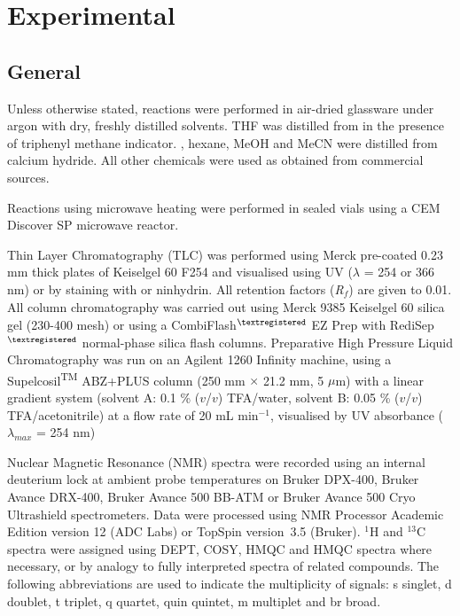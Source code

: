 \newpage

\section{Experimental}

\subsection{General}

Unless otherwise stated, reactions were performed in air-dried glassware under argon with dry, freshly distilled solvents. THF was distilled from  in the presence of triphenyl methane indicator. , hexane, MeOH and MeCN were distilled from calcium hydride. All other chemicals were used as obtained from commercial sources.

Reactions using microwave heating were performed in sealed vials using a CEM Discover SP microwave reactor. 

Thin Layer Chromatography (TLC) was performed using Merck pre-coated 0.23 mm thick plates of Keiselgel 60 F254 and visualised using UV ($\lambda$ = 254 or 366 nm) or by staining with  or ninhydrin. 
All retention factors (\textit{R}$_\textit{f}$) are given to 0.01. 
All column chromatography was carried out using Merck 9385 Keiselgel 60 silica gel (230-400 mesh) or using a CombiFlash$^{\tiny{\textregistered}}$ EZ Prep with RediSep$^{\tiny{\textregistered}}$ normal-phase silica flash columns. 
Preparative High Pressure Liquid Chromatography was run on an Agilent 1260 Infinity machine, using a Supelcosil\textsuperscript{TM} ABZ+PLUS column (250 mm $\times$ 21.2 mm, 5 $\mu$m) with a linear gradient system (solvent A: 0.1 \% ($v$/$v$) TFA/water, solvent B: 0.05 \% ($v$/$v$) TFA/acetonitrile) at a flow rate of 20 mL min$^{-1}$, visualised by UV absorbance ($\lambda_{max}$ = 254 nm)

Nuclear Magnetic Resonance (NMR) spectra were recorded using an internal deuterium lock at ambient probe temperatures on Bruker DPX-400, Bruker Avance DRX-400, Bruker Avance 500 BB-ATM or Bruker Avance 500 Cryo Ultrashield spectrometers. Data were processed using NMR Processor Academic Edition version 12 (ADC Labs) or TopSpin version 3.5 (Bruker). $^1$H and $^13$C spectra were assigned using DEPT, COSY, HMQC and HMQC spectra where necessary, or by analogy to fully interpreted spectra of related compounds. The following abbreviations are used to indicate the multiplicity of signals: s singlet, d doublet, t triplet, q quartet, quin quintet, m multiplet and br broad.

